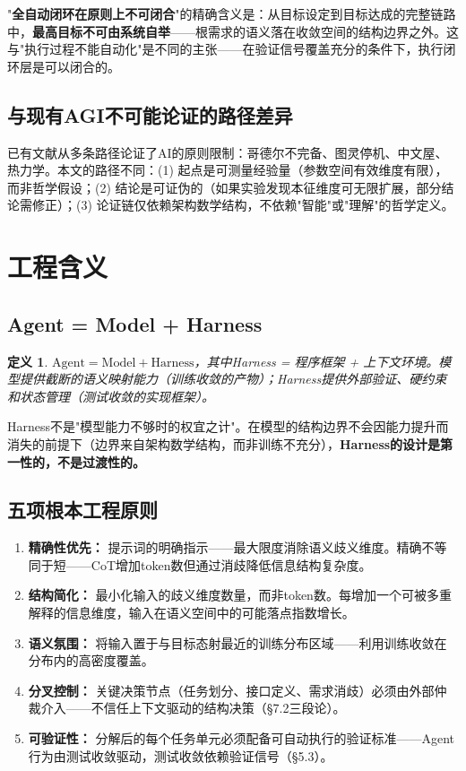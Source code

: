 \documentclass[11pt,a4paper]{ctexart}
\newtheorem{definition}[theorem]{定义}
\begin{document}
"\textbf{全自动闭环在原则上不可闭合}"的精确含义是：从目标设定到目标达成的完整链路中，\textbf{最高目标不可由系统自举}——根需求的语义落在收敛空间的结构边界之外。这与"执行过程不能自动化"是不同的主张——在验证信号覆盖充分的条件下，执行闭环层是可以闭合的。

\subsection{与现有AGI不可能论证的路径差异}

已有文献从多条路径论证了AI的原则限制\cite{Schlereth2025ICB,Bui2025Foundations}：哥德尔不完备、图灵停机、中文屋、热力学。本文的路径不同：(1) 起点是可测量经验量（参数空间有效维度有限），而非哲学假设；(2) 结论是可证伪的（如果实验发现本征维度可无限扩展，部分结论需修正）；(3) 论证链仅依赖架构数学结构，不依赖"智能"或"理解"的哲学定义。


\section{工程含义}

\subsection{Agent = Model + Harness}

\begin{definition}
    $\mathrm{Agent} = \mathrm{Model} + \mathrm{Harness}$，其中Harness = 程序框架 + 上下文环境。模型提供截断的语义映射能力（训练收敛的产物）；Harness提供外部验证、硬约束和状态管理（测试收敛的实现框架）。
\end{definition}

Harness不是"模型能力不够时的权宜之计"。在模型的结构边界不会因能力提升而消失的前提下（边界来自架构数学结构，而非训练不充分），\textbf{Harness的设计是第一性的，不是过渡性的。}

\subsection{五项根本工程原则}

\begin{enumerate}[leftmargin=*,label=\textbf{P\arabic*}.]
    \item \textbf{精确性优先：} 提示词的明确指示——最大限度消除语义歧义维度。精确不等同于短——CoT增加token数但通过消歧降低信息结构复杂度。
    \item \textbf{结构简化：} 最小化输入的歧义维度数量，而非token数。每增加一个可被多重解释的信息维度，输入在语义空间中的可能落点指数增长。
    \item \textbf{语义氛围：} 将输入置于与目标态射最近的训练分布区域——利用训练收敛在分布内的高密度覆盖。
    \item \textbf{分叉控制：} 关键决策节点（任务划分、接口定义、需求消歧）必须由外部仲裁介入——不信任上下文驱动的结构决策（§7.2三段论）。
    \item \textbf{可验证性：} 分解后的每个任务单元必须配备可自动执行的验证标准——Agent行为由测试收敛驱动，测试收敛依赖验证信号（§5.3）。
\end{enumerate}
\end{document}
